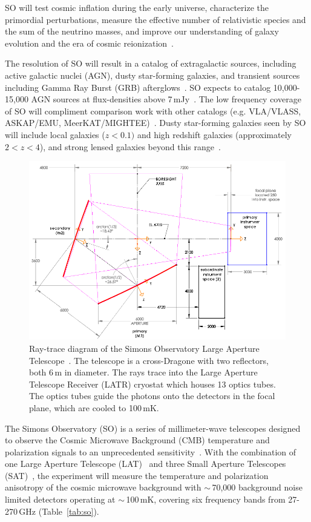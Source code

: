 SO will test cosmic inflation during the early universe, characterize the primordial perturbations, measure the effective number of relativistic species and the sum of the neutrino masses, and improve our understanding of galaxy evolution and the era of cosmic reionization~\citep{so19,so_science}. 

The resolution of SO will result in a catalog of extragalactic sources, including active galactic nuclei (AGN), dusty star-forming galaxies, and transient sources including Gamma Ray Burst (GRB) afterglows~\cite{so_science}.  SO expects to catalog 10,000-15,000 AGN sources at flux-densities above 7\,mJy~\cite{Tucci_2011}.  The low frequency coverage of SO will compliment comparison work with other catalogs (e.g. VLA/VLASS, ASKAP/EMU, MeerKAT/MIGHTEE)~\cite{so_science}.  Dusty star-forming galaxies seen by SO will include local galaxies ($z<0.1)$ and high redshift galaxies (approximately $2<z<4$), and strong lensed galaxies beyond this range~\cite{Marrone_2017}.

\begin{figure}[t]
    \centering
    \includegraphics[width = .95\textwidth]{Figures/LAT_rt.pdf}
    \caption{Ray-trace diagram of the Simons Observatory Large Aperture Telescope~\cite{Parshley_2018}.  The telescope is a cross-Dragone with two reflectors, both 6\,m in diameter.  The rays trace into the Large Aperture Telescope Receiver (LATR) cryostat which houses 13 optics tubes.  The optics tubes guide the photons onto the detectors in the focal plane, which are cooled to 100\,mK.}
    \label{fig:so_inst}
\end{figure}

The Simons Observatory (SO) is a series of millimeter-wave telescopes designed to observe the Cosmic Microwave Background (CMB) temperature and polarization signals to an unprecedented sensitivity~\cite{gali18, so19}. With the combination of one Large Aperture Telescope (LAT)~\cite{xu/etal:2020c, zhu18, orlo18, coppi/etal:2018} and three Small Aperture Telescopes (SAT)~\cite{ali20}, the experiment will measure the temperature and polarization anisotropy of the cosmic microwave background with $\sim$\,70,000 background noise limited detectors operating at $\sim$\,100\,mK, covering six frequency bands from 27-270\,GHz (Table~\ref{tab:so}).

